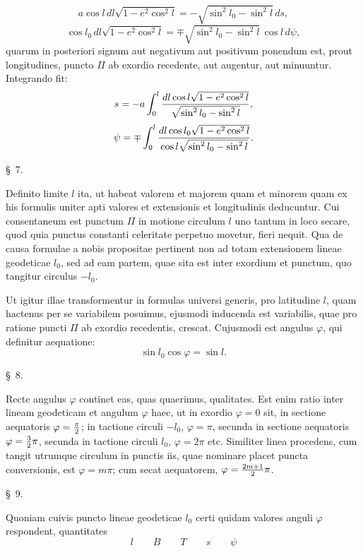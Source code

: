 \[
 a\cos l\,dl\sqrt{1-e^2\cos^2l}=-\sqrt{\sin^2l_0-\sin^2l}\,ds,
\]
\[
 \cos l_0\,dl\sqrt{1-e^2\cos^2l}=\mp\sqrt{\sin^2l_0-\sin^2l}\,\cos l\,d\psi,
\]
quarum in posteriori signum aut negativum aut positivum ponendum est, prout longitudines, puncto $\Pi$ ab exordio recedente, aut augentur, aut minuuntur. Integrando fit:
\[
 s=-a\int_0^l {dl\cos l\sqrt{1-e^2\cos^2l}\over\sqrt{\sin^2l_0-\sin^2l}},
\]
\[
 \psi=\mp\int_0^l {dl\cos l_0\sqrt{1-e^2\cos^2l}\over\cos l\sqrt{\sin^2l_0-\sin^2l}}.
\]

\begin{center}\S\ 7.\end{center}
Definito limite $l$ ita, ut habeat valorem et majorem quam  et minorem quam  ex his formulis uniter apti valores et extensionis et longitudinis deducuntur. Cui consentaneum est punctum $\Pi$ in motione circulum $l$ uno tantum in loco secare, quod quia punctus constanti celeritate perpetuo movetur, fieri nequit. Qua de causa formulae a nobis propositae pertinent non ad totam extensionem lineae geodeticae $l_0$, sed ad eam partem, quae sita est inter exordium et punctum, quo tangitur circulus $-l_0$.

Ut igitur illae transformentur in formulas universi generis, pro latitudine $l$, quam hactenus per se variabilem posuimus, ejusmodi inducenda est variabilis, quae pro ratione puncti $\Pi$ ab exordio recedentis, crescat. Cujusmodi est angulus $\varphi$, qui definitur aequatione:
\[
 \sin l_0\cos\varphi=\sin l.
\]

\begin{center}\S\ 8.\end{center}
Recte angulus $\varphi$ continet eas, quas quaerimus, qualitates. Est enim ratio inter lineam geodeticam et angulum $\varphi$ haec, ut in exordio $\varphi=0$ sit, in sectione aequatoris $\varphi={\pi\over 2}$; in tactione circuli $-l_0$, $\varphi=\pi$, secunda in sectione aequatoris $\varphi={3\over2}\pi$, secunda in tactione circuli $l_0$, $\varphi=2\pi$ etc. Similiter linea procedens, cum tangit utrumque circulum in punctis iis, quae nominare placet puncta conversionis, est $\varphi=m\pi$; cum secat aequatorem, $\varphi={2m+1\over2}\pi$.

\begin{center}\S\ 9.\end{center}
Quoniam cuivis puncto lineae geodeticae $l_0$ certi quidam valores anguli $\varphi$ respondent, quantitates
\[
 l\qquad B\qquad T\qquad s\qquad \psi
\]

